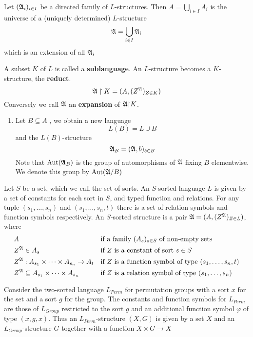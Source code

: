 \documentclass[11pt]{article}
\begin{document}
\begin{lemma}[]
Let \((\mathfrak{A}_i)_{i\in I}\) be a directed family of \(L\)-structures. Then
\(A=\bigcup_{i\in I}A_i\) is the universe of a (uniquely determined)
\(L\)-structure
\begin{equation*}
\mathfrak{A}=\bigcup_{i\in I}\mathfrak{A}_i
\end{equation*}
which is an extension of all \(\mathfrak{A}_i\)
\end{lemma}

A subset \(K\) of \(L\) is called a \textbf{sublanguage}. An \(L\)-structure becomes a
\(K\)-structure, the \textbf{reduct}.
\begin{equation*}
\mathfrak{A}\upharpoonright K=(A,(Z^{\mathfrak{A}})_{Z\in K})
\end{equation*}
Conversely we call \(\mathfrak{A}\) an \textbf{expansion} of \(\mathfrak{A}\mathord{\upharpoonright} K\).
\begin{enumerate}
\item Let \(B\subseteq A\) , we obtain a new language
\begin{equation*}
L(B)=L\cup B
\end{equation*}
and the \(L(B)\)-structure 
\begin{equation*}
\mathfrak{A}_B=(\mathfrak{A},b)_{b\in B}
\end{equation*}
Note that \(\operatorname{\text{Aut}}(\mathfrak{A}_B)\) is the group of automorphisms of \(\mathfrak{A}\) fixing
\(B\) elementwise. We denote this group by \(\operatorname{\text{Aut}}(\mathfrak{A}/B)\)
\end{enumerate}


Let \(S\) be a set, which we call the set of sorts. An \(S\)-sorted
language \(L\) is given by a set of constants for each sort in \(S\), and
typed function and relations. For any tuple \((s_1,\dots,s_n)\) and
\((s_1,\dots,s_n,t)\) there is a set of relation symbols and function
symbols respectively. An \(S\)-sorted structure is a pair
\(\mathfrak{A}=(A,(Z^{\mathfrak{A}})_{Z\in L})\), where 
\begin{alignat*}{2}      
&A&&\text{if a family $(A_s)_{s\in S}$ of non-empty sets}\\
&Z^{\mathfrak{A}}\in A_s&&\text{if $Z$ is a constant of sort $s\in S$}\\
&Z^{\mathfrak{A}}:A_{s_1}\times\dots\times A_{s_n}\to A_t&&\text{if $Z$ is a
function symbol of type $(s_1,\dots,s_n,t)$}\\
&Z^{\mathfrak{A}}\subseteq A_{s_1}\times\dots\times A_{s_n}&&\text{if $Z$ is a
relation symbol of type $(s_1,\dots,s_n)$}
\end{alignat*}

\begin{examplle}[]
Consider the two-sorted language \(L_{Perm}\) for permutation groups with a
sort \(x\) for the set and a sort \(g\) for the group. The constants and
function symbols for \(L_{Perm}\) are those of \(L_{Group}\) restricted to
the sort \(g\) and an additional function symbol \(\varphi\) of type \((x,g,x)\). Thus
an \(L_{Perm}\)-structure \((X,G)\) is given by a set \(X\) and an
\(L_{Group}\)-structure \(G\) together with a function \(X\times G\to X\)
\end{examplle}
\end{document}
